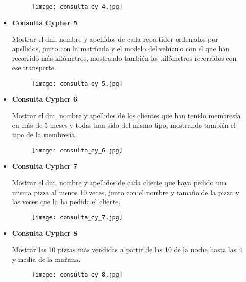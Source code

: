 \documentclass[a4paper]{article}
\begin{document}
\begin{itemize}
    \begin{figure}[H]
        \centering
        \texttt{[image: consulta\_cy\_4.jpg]}
        \label{fig:consulta_cy_4}
    \end{figure}

    \newpage

    \item \textbf{\large{Consulta Cypher 5}}

        Mostrar el dni, nombre y apellidos de cada repartidor ordenados por apellidos, junto con la matrícula y el modelo del vehículo con el que han recorrido más kilómetros, mostrando también los kilómetros recorridos con ese transporte.
        
    \begin{figure}[H]
        \centering
        \texttt{[image: consulta\_cy\_5.jpg]}
        \label{fig:consulta_cy_5}
    \end{figure}

    \vspace{1cm}

    \item \textbf{\large{Consulta Cypher 6}}

        Mostrar el dni, nombre y apellidos de los clientes que han tenido membresía en más de 5 meses y todas han sido del mismo tipo, mostrando también el tipo de la membresía.
        
    \begin{figure}[H]
        \centering
        \texttt{[image: consulta\_cy\_6.jpg]}
        \label{fig:consulta_cy_6}
    \end{figure}

    \newpage

    \item \textbf{\large{Consulta Cypher 7}}

        Mostrar el dni, nombre y apellidos de cada cliente que haya pedido una misma pizza al menos 10 veces, junto con el nombre y tamaño de la pizza y las veces que la ha pedido el cliente.
        
    \begin{figure}[H]
        \centering
        \texttt{[image: consulta\_cy\_7.jpg]}
        \label{fig:consulta_cy_7}
    \end{figure}

    \vspace{1cm}

    \item \textbf{\large{Consulta Cypher 8}}

        Mostrar las 10 pizzas más vendidas a partir de las 10 de la noche hasta las 4 y media de la mañana.
        
    \begin{figure}[H]
        \centering
        \texttt{[image: consulta\_cy\_8.jpg]}
        \label{fig:consulta_cy_8}
    \end{figure}

\end{itemize}
\end{document}
